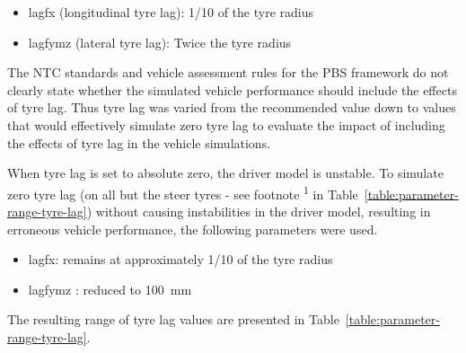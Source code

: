 \begin{itemize}
	\item \gls{lagfx} (longitudinal tyre lag): 1/10 of the tyre radius
	\item \gls{lagfymz} (lateral tyre lag): Twice the tyre radius
\end{itemize}

The NTC standards and vehicle assessment rules for the PBS framework \cite{NationalTransportCommission2008} do not clearly state whether the simulated vehicle performance should include the effects of tyre lag. Thus tyre lag was varied from the recommended value down to values that would effectively simulate zero tyre lag to evaluate the impact of including the effects of tyre lag in the vehicle simulations.

When tyre lag is set to absolute zero, the driver model is unstable. To simulate zero tyre lag (on all but the steer tyres - see footnote \textsuperscript{1} in Table~\ref{table:parameter-range-tyre-lag}) without causing instabilities in the driver model, resulting in erroneous vehicle performance, the following parameters were used.

\begin{itemize}
	\item \gls{lagfx}: remains at approximately 1/10 of the tyre radius
	\item \gls{lagfymz} : reduced to 100~mm
\end{itemize}

The resulting range of tyre lag values are presented in Table~\ref{table:parameter-range-tyre-lag}.

